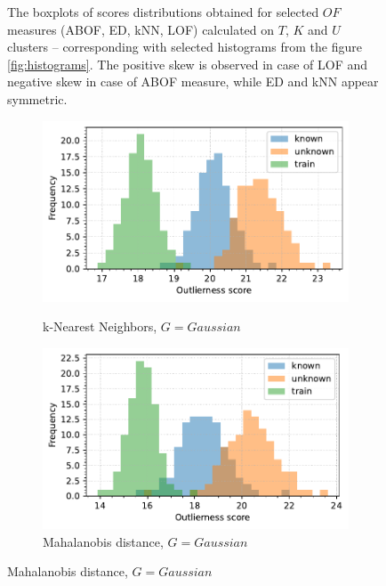 \begin{figure}[t]
\begin{subfigure}[b]{\textwidth}
        \label{fig:box-lof}
    \end{subfigure}
    \caption{The boxplots of scores distributions obtained for selected $OF$ measures (ABOF, ED, kNN, LOF) calculated on $T$, $K$ and $U$ clusters – corresponding with selected histograms from the figure \ref{fig:histograms}. The positive skew is observed in case of LOF and negative skew in case of ABOF measure, while ED and kNN appear symmetric.}
    \label{fig:boxplots}
\end{figure}

\begin{figure}[t]
    \centering
    \begin{subfigure}[b]{0.495\textwidth}
        \centering
        \caption{\small k-Nearest Neighbors, $G = \textit{Gaussian}$}
        \includegraphics[width=\textwidth]{images/distributions/hists-Gen/hist-distributions-dimension_250-samples_1000-distance_8-distribution_gaussian-model_kNN-10-seed_0.pdf}
        \label{fig:hists-knn-gaussian}
    \end{subfigure}
    \hfill
    \begin{subfigure}[b]{0.495\textwidth}
        \centering
        \caption{\small Mahalanobis distance, $G = \textit{Gaussian}$}
        \includegraphics[width=\textwidth]{images/distributions/hists-Gen/hist-distributions-dimension_250-samples_1000-distance_8-distribution_gaussian-model_MD-seed_0.pdf}

\end{subfigure}
\end{figure}
